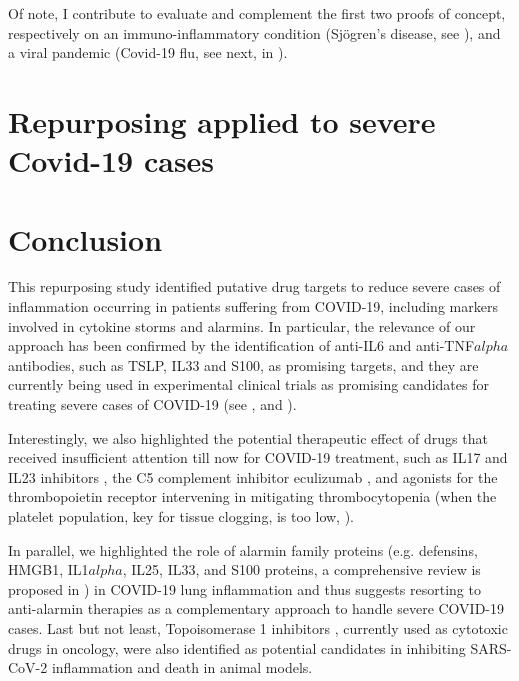 Of note, I contribute to evaluate and complement the first two proofs of concept, respectively on an immuno-inflammatory condition (Sjögren's disease, see ), and a viral pandemic (Covid-19 flu, see next, in ).


\section{Repurposing applied to severe Covid-19 cases}
\label{sec:covid19-repurposing}



\section{Conclusion}
This repurposing study identified putative drug targets to reduce severe cases of inflammation occurring in patients suffering from COVID-19, including markers involved in cytokine storms and alarmins. In particular, the relevance of our approach has been confirmed by the identification of anti-IL6 and anti-TNF$alpha$ antibodies, such as TSLP, IL33 and S100, as promising targets, and they are currently being used in experimental clinical trials as promising candidates for treating severe cases of COVID-19 (see \autocite{yalcinkehribar_etal21}, \autocite{roth_etal20} and \autocite{idris_etal20}).

Interestingly, we also highlighted the potential therapeutic effect of drugs that received insufficient attention till now for COVID-19 treatment, such as IL17 and IL23 inhibitors \autocite{pacha_etal20}, the C5 complement inhibitor eculizumab \autocite{carvelli_etal20}, and agonists for the thrombopoietin receptor intervening in mitigating thrombocytopenia (when the platelet population, key for tissue clogging, is too low, \autocite{schneider_etal21}). 

In parallel, we highlighted the role of alarmin family proteins (e.g. defensins, HMGB1, IL1$alpha$, IL25, IL33, and S100 proteins, a comprehensive review is proposed in \autocite{yang_etal17}) in COVID-19 lung inflammation and thus suggests resorting to anti-alarmin therapies as a complementary approach to handle severe COVID-19 cases. Last but not least, Topoisomerase 1 inhibitors \autocite{ho_etal20}, currently used as cytotoxic drugs in oncology, were also identified as potential candidates in inhibiting SARS-CoV-2 inflammation and death in animal models. 

